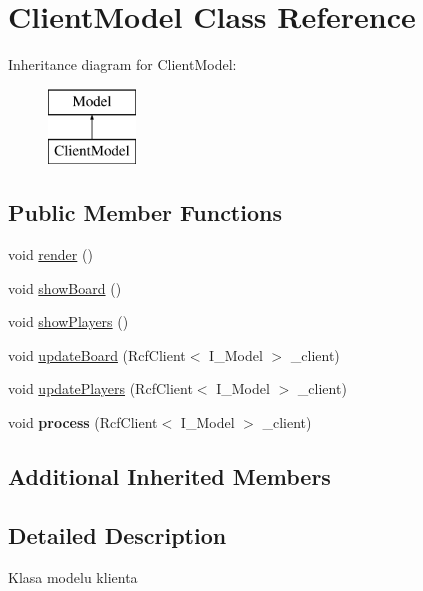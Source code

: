 \hypertarget{classClientModel}{\section{Client\-Model Class Reference}
\label{classClientModel}
}
Inheritance diagram for Client\-Model\-:\begin{figure}[H]
\begin{center}
\leavevmode
\includegraphics[height=2.000000cm]{classClientModel}
\end{center}
\end{figure}
\subsection*{Public Member Functions}
\begin{DoxyCompactItemize}
\item 
void \hyperlink{classClientModel_a7a843e039b6688f7c5252541ba712ef7}{render} ()
\item 
void \hyperlink{classClientModel_a437049cfcf845c836ad1f70305146daa}{show\-Board} ()
\item 
void \hyperlink{classClientModel_a0654ad96265273f41fb296bcf76ecca1}{show\-Players} ()
\item 
void \hyperlink{classClientModel_ae88e9b8273f5f81dfa7be9b8b0115c99}{update\-Board} (Rcf\-Client$<$ I\-\_\-\-Model $>$ \-\_\-client)
\item 
void \hyperlink{classClientModel_a05020d4d1665fea6f20f9ff633467cac}{update\-Players} (Rcf\-Client$<$ I\-\_\-\-Model $>$ \-\_\-client)
\item 
\hypertarget{classClientModel_a12044fc4df03e7651117c4cb0812810a}{void {\bfseries process} (Rcf\-Client$<$ I\-\_\-\-Model $>$ \-\_\-client)}\label{classClientModel_a12044fc4df03e7651117c4cb0812810a}

\end{DoxyCompactItemize}
\subsection*{Additional Inherited Members}


\subsection{Detailed Description}
Klasa modelu klienta 

